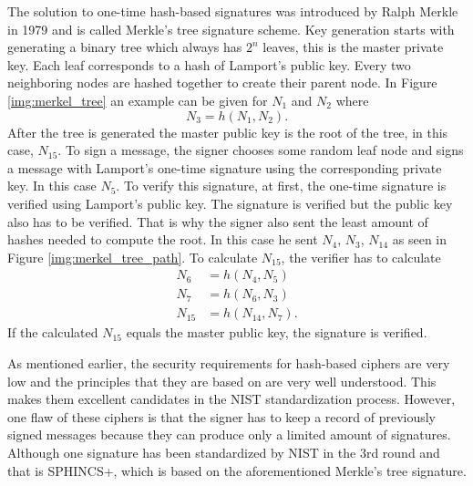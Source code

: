 The solution to one-time hash-based signatures was introduced by Ralph Merkle in 1979 and is called Merkle's tree signature scheme. Key generation starts with generating a binary tree which always has $2^n$ leaves, this is the master private key. Each leaf corresponds to a hash of Lamport's public key. Every two neighboring nodes are hashed together to create their parent node. In Figure \ref{img:merkel_tree} an example can be given for $N_1$ and $N_2$ where
\begin{equation}
  N_3=h(N_1, N_2).
\end{equation}
\noindent After the tree is generated the master public key is the root of the tree, in this case, $N_{15}$. To sign a message, the signer chooses some random leaf node and signs a message with Lamport's one-time signature using the corresponding private key. In this case $N_5$. To verify this signature, at first, the one-time signature is verified using Lamport's public key. The signature is verified but the public key also has to be verified. That is why the signer also sent the least amount of hashes needed to compute the root. In this case he sent $N_4$, $N_3$, $N_{14}$ as seen in Figure \ref{img:merkel_tree_path}. To calculate $N_{15}$, the verifier has to calculate
\begin{align}
  N_6    & =h(N_4,N_5)     \\
  N_7    & =h(N_6,N_3)     \\
  N_{15} & =h(N_{14},N_7).
\end{align}
If the calculated $N_{15}$ equals the master public key, the signature is verified. \cite{Bernstein2009}

As mentioned earlier, the security requirements for hash-based ciphers are very low and the principles that they are based on are very well understood. This makes them excellent candidates in the NIST standardization process. However, one flaw of these ciphers is that the signer has to keep a record of previously signed messages because they can produce only a limited amount of signatures. Although one signature has been standardized by NIST in the 3rd round and that is SPHINCS+, which is based on the aforementioned Merkle's tree signature.
